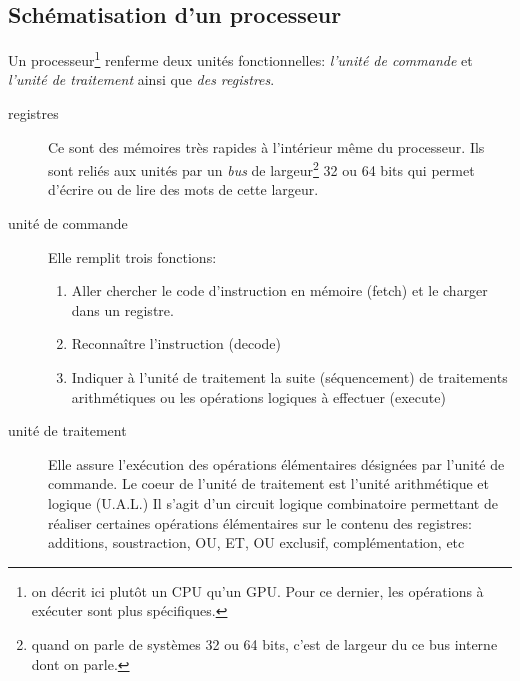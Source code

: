 \subsection{Schématisation d'un processeur}
Un processeur\footnote{on décrit ici plutôt un CPU qu'un GPU. Pour ce dernier, les opérations à exécuter sont plus spécifiques.} renferme deux unités fonctionnelles: \emph{l'unité de commande} et \emph{l'unité de traitement} ainsi que \emph{des registres}.
\begin{description}
 \item[registres] Ce sont des mémoires très rapides à l'intérieur même du processeur. Ils sont reliés aux unités par un \emph{bus} de largeur\footnote{quand on parle de systèmes 32 ou 64 bits, c'est de largeur du ce bus interne dont on parle.} 32 ou 64 bits qui permet d'écrire ou de lire des mots de cette largeur.
 \item[unité de commande] Elle remplit trois fonctions:
 \begin{enumerate}
  \item Aller chercher le code d'instruction en mémoire (fetch) et le charger dans un registre.
  \item Reconnaître l'instruction (decode)
  \item Indiquer à l'unité de traitement la suite (séquencement) de traitements arithmétiques ou les opérations logiques à effectuer (execute) 
 \end{enumerate}
 \item[unité de traitement] Elle assure l'exécution des opérations élémentaires désignées par l'unité de commande. Le coeur de l'unité de traitement est l'unité arithmétique et logique (U.A.L.) Il s'agit d'un circuit logique combinatoire permettant de réaliser certaines opérations élémentaires sur le contenu des registres: additions, soustraction, OU, ET, OU exclusif, complémentation, etc 
\end{description}

